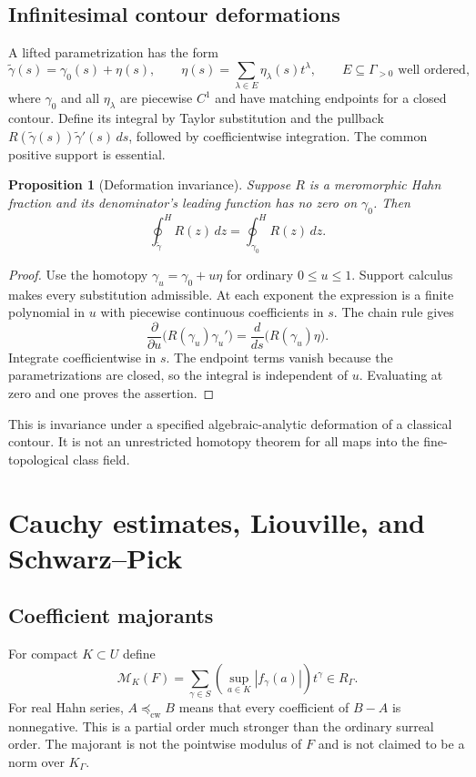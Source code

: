 \documentclass[11pt,a4paper]{article}
\newtheorem{proposition}[theorem]{Proposition}
\theoremstyle{definition}
\theoremstyle{remark}
\newcommand{\cw}{\preccurlyeq_{\mathrm{cw}}}
\newcommand{\Hoint}{\mathop{\oint}\nolimits^{\!H}}
\begin{document}
\subsection{Infinitesimal contour deformations}
A lifted parametrization has the form
\[
 \widetilde\gamma(s)=\gamma_0(s)+\eta(s),\qquad
 \eta(s)=\sum_{\lambda\in E}\eta_\lambda(s)t^\lambda,
 \qquad E\subseteq\Gamma_{>0}\text{ well ordered},
\]
where $\gamma_0$ and all $\eta_\lambda$ are piecewise $C^1$ and
have matching endpoints for a closed contour. Define its integral by
Taylor substitution and the pullback
$R(\widetilde\gamma(s))\widetilde\gamma'(s)\,ds$, followed by
coefficientwise integration. The common positive support is essential.

\begin{proposition}[Deformation invariance]\label{prop:deformation}
Suppose $R$ is a meromorphic Hahn fraction and its denominator's
leading function has no zero on $\gamma_0$. Then
\[
 \Hoint_{\widetilde\gamma}R(z)\,dz
      =\Hoint_{\gamma_0}R(z)\,dz.
\]
\end{proposition}
\begin{proof}
Use the homotopy $\gamma_u=\gamma_0+u\eta$ for ordinary
$0\le u\le1$. Support calculus makes every substitution admissible.
At each exponent the expression is a finite polynomial in $u$ with
piecewise continuous coefficients in $s$. The chain rule gives
\[
 \frac{\partial}{\partial u}
  \bigl(R(\gamma_u)\gamma_u'\bigr)
     =\frac{d}{ds}\bigl(R(\gamma_u)\eta\bigr).
\]
Integrate coefficientwise in $s$. The endpoint terms vanish because
the parametrizations are closed, so the integral is independent of
$u$. Evaluating at zero and one proves the assertion.
\end{proof}
This is invariance under a specified algebraic-analytic deformation of
a classical contour. It is not an unrestricted homotopy theorem for
all maps into the fine-topological class field.

\section{Cauchy estimates, Liouville, and Schwarz--Pick}\label{sec:bounds}
\subsection{Coefficient majorants}
For compact $K\subset U$ define
\begin{equation}\label{eq:majorant}
 \mathcal M_K(F)=\sum_{\gamma\in S}
          \left(\sup_{a\in K}|f_\gamma(a)|\right)t^\gamma
          \in R_\Gamma.
\end{equation}
For real Hahn series, $A\cw B$ means that every coefficient of
$B-A$ is nonnegative. This is a partial order much stronger than the
ordinary surreal order. The majorant is not the pointwise modulus of
$F$ and is not claimed to be a norm over $K_\Gamma$.
\end{document}
